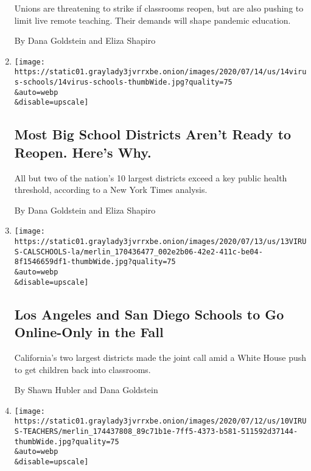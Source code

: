 \begin{enumerate}
  Unions are threatening to strike if classrooms reopen, but are also
  pushing to limit live remote teaching. Their demands will shape
  pandemic education.

  By Dana Goldstein and Eliza Shapiro
\item
  \href{/2020/07/14/us/coronavirus-schools-fall.html}{}

  \texttt{[image: https://static01.graylady3jvrrxbe.onion/images/2020/07/14/us/14virus-schools/14virus-schools-thumbWide.jpg?quality=75\\\&auto=webp\\\&disable=upscale]}

  \hypertarget{most-big-school-districts-arent-ready-to-reopen-heres-why}{%
  \subsection{Most Big School Districts Aren't Ready to Reopen. Here's
  Why.}\label{most-big-school-districts-arent-ready-to-reopen-heres-why}}

  All but two of the nation's 10 largest districts exceed a key public
  health threshold, according to a New York Times analysis.

  By Dana Goldstein and Eliza Shapiro
\item
  \href{/2020/07/13/us/lausd-san-diego-school-reopening.html}{}

  \texttt{[image: https://static01.graylady3jvrrxbe.onion/images/2020/07/13/us/13VIRUS-CALSCHOOLS-la/merlin\_170436477\_002e2b06-42e2-411c-be04-8f1546659df1-thumbWide.jpg?quality=75\\\&auto=webp\\\&disable=upscale]}

  \hypertarget{los-angeles-and-san-diego-schools-to-go-online-only-in-the-fall}{%
  \subsection{Los Angeles and San Diego Schools to Go Online-Only in the
  Fall}\label{los-angeles-and-san-diego-schools-to-go-online-only-in-the-fall}}

  California's two largest districts made the joint call amid a White
  House push to get children back into classrooms.

  By Shawn Hubler and Dana Goldstein
\item
  \href{/2020/07/11/us/virus-teachers-classrooms.html}{}

  \texttt{[image: https://static01.graylady3jvrrxbe.onion/images/2020/07/12/us/10VIRUS-TEACHERS/merlin\_174437808\_89c71b1e-7ff5-4373-b581-511592d37144-thumbWide.jpg?quality=75\\\&auto=webp\\\&disable=upscale]}


\end{enumerate}
